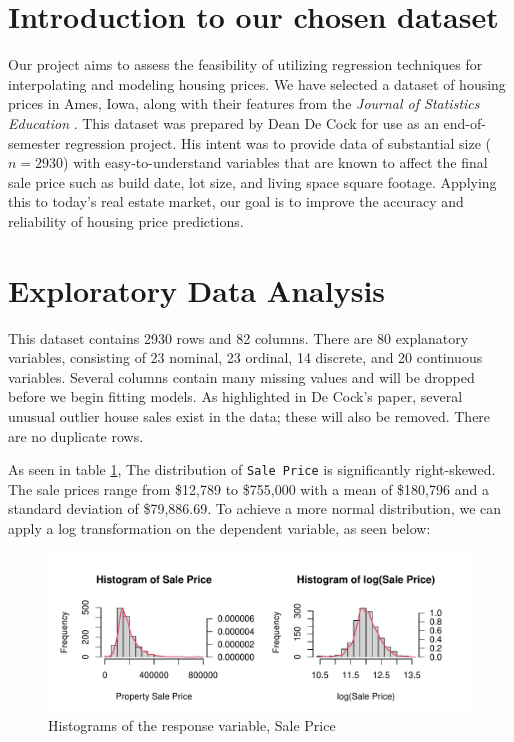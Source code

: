 \documentclass[aoas]{imsart}
\numberwithin{equation}{section}
\theoremstyle{plain}
\theoremstyle{remark}
\begin{document}
\newenvironment{kframe}{}{}

\hypertarget{introduction-to-our-chosen-dataset}{%
\section{Introduction to our chosen
dataset}\label{introduction-to-our-chosen-dataset}}

Our project aims to assess the feasibility of utilizing regression
techniques for interpolating and modeling housing prices. We have
selected a dataset of housing prices in Ames, Iowa, along with their
features from the \emph{Journal of Statistics Education}
\citep{cock2011amesdataset}. This dataset was prepared by Dean De Cock
for use as an end-of-semester regression project. His intent was to
provide data of substantial size (\(n=2930\)) with easy-to-understand
variables that are known to affect the final sale price such as build
date, lot size, and living space square footage. Applying this to
today's real estate market, our goal is to improve the accuracy and
reliability of housing price predictions.

\hypertarget{exploratory-data-analysis}{%
\section{Exploratory Data Analysis}\label{exploratory-data-analysis}}

This dataset contains 2930 rows and 82 columns. There are 80 explanatory
variables, consisting of 23 nominal, 23 ordinal, 14 discrete, and 20
continuous variables. Several columns contain many missing values and
will be dropped before we begin fitting models. As highlighted in De
Cock's paper, several unusual outlier house sales exist in the data;
these will also be removed. There are no duplicate rows.

As seen in table \ref{resp}, The distribution of \texttt{Sale\ Price} is
significantly right-skewed. The sale prices range from \$12,789 to
\$755,000 with a mean of \$180,796 and a standard deviation of
\$79,886.69. To achieve a more normal distribution, we can apply a log
transformation on the dependent variable, as seen below:

\begin{figure}
\centering
\includegraphics{STAT-444-FINAL-PROJECT-PROPOSAL_files/figure-latex/unnamed-chunk-3-1.pdf}
\caption{Histograms of the response variable, Sale Price\label{resp}}
\end{figure}
\end{document}
